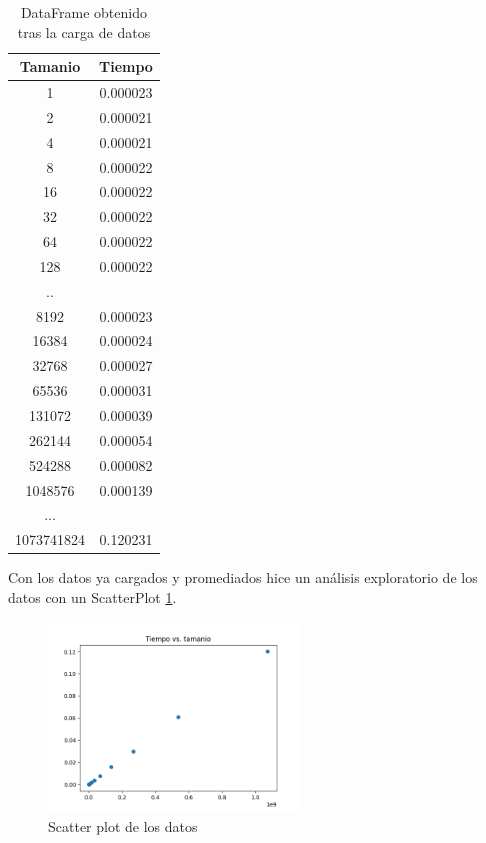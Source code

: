 \begin{table}[H]
\centering
 \begin{tabular}{|c | c|} 
 \hline
    Tamanio & Tiempo \\
    \hline
    1 & 0.000023 \\
    2 & 0.000021 \\
    4 & 0.000021 \\
    8 & 0.000022 \\
    16 & 0.000022 \\
    32 & 0.000022 \\
    64 & 0.000022 \\
    128 & 0.000022 \\
    .. & \\
    8192 & 0.000023 \\
    16384 & 0.000024 \\
    32768 & 0.000027 \\
    65536 & 0.000031 \\
    131072 & 0.000039 \\
    262144 & 0.000054 \\
    524288 & 0.000082 \\
    1048576 & 0.000139 \\
    ... & \\
    1073741824 & 0.120231 \\
 \hline
 \end{tabular}
 \caption{DataFrame obtenido tras la carga de datos}
\label{tab:ej1}
\end{table}

Con los datos ya cargados y promediados hice un análisis exploratorio de los datos con un ScatterPlot \ref{fig:scatterej1}.

\begin{figure}[H]
    \centering
    \includegraphics[width=0.60\textwidth]{Images/ej1/scatterej1.png}
    \caption{Scatter plot de los datos}
    \label{fig:scatterej1}
\end{figure}


